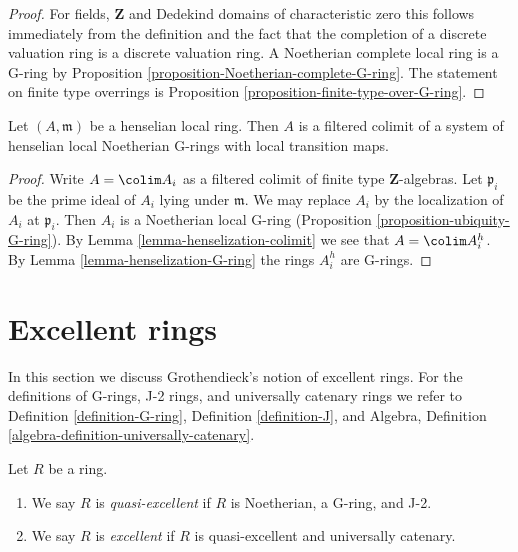 \begin{proof}
For fields, $\mathbf{Z}$ and Dedekind domains of characteristic zero
this follows immediately from the definition and the fact that the
completion of a discrete valuation ring is a discrete valuation ring.
A Noetherian complete local ring is a G-ring by
Proposition \ref{proposition-Noetherian-complete-G-ring}.
The statement on finite type overrings is
Proposition \ref{proposition-finite-type-over-G-ring}.
\end{proof}

\begin{lemma}
\label{lemma-henselian-local-limit-G-rings}
Let $(A, \mathfrak m)$ be a henselian local ring.
Then $A$ is a filtered colimit of a system
of henselian local Noetherian G-rings with local
transition maps.
\end{lemma}

\begin{proof}
Write $A = \colim A_i$ as a filtered colimit of finite type
$\mathbf{Z}$-algebras. Let $\mathfrak p_i$ be the prime ideal of
$A_i$ lying under $\mathfrak m$. We may replace $A_i$ by the
localization of $A_i$ at $\mathfrak p_i$. Then $A_i$ is a
Noetherian local G-ring (Proposition \ref{proposition-ubiquity-G-ring}).
By Lemma \ref{lemma-henselization-colimit}
we see that $A = \colim A_i^h$. By
Lemma \ref{lemma-henselization-G-ring}
the rings $A_i^h$ are G-rings.
\end{proof}




\section{Excellent rings}
\label{section-excellent}

\noindent
In this section we discuss Grothendieck's notion of excellent rings.
For the definitions of G-rings, J-2 rings, and universally catenary rings
we refer to Definition \ref{definition-G-ring},
Definition \ref{definition-J}, and
Algebra, Definition \ref{algebra-definition-universally-catenary}.

\begin{definition}
\label{definition-excellent}
Let $R$ be a ring.
\begin{enumerate}
\item We say $R$ is {\it quasi-excellent} if $R$ is Noetherian,
a G-ring, and J-2.
\item We say $R$ is {\it excellent} if $R$ is quasi-excellent
and universally catenary.
\end{enumerate}
\end{definition}

